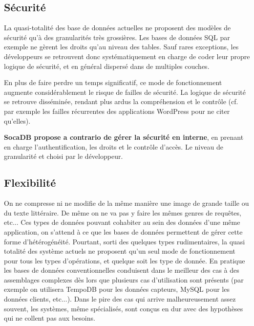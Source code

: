 \documentclass[a4paper,10pt]{scrreprt}
\begin{document}
        \subsection{Sécurité}
        
            La quasi-totalité des base de données actuelles ne proposent des modèles de sécurité qu'à des granularités très grossières. Les bases de données SQL par exemple ne gèrent les droits qu'au niveau des tables. Sauf rares exceptions, les dévelop\-peurs se retrouvent donc systématiquement en charge de coder leur propre logique de sécurité, et en général dispersé dans de multiples couches.
            
            En plus de faire perdre un temps significatif, ce mode de fonctionnement augmente considérablement le risque de failles de sécurité. La logique de sécurité se retrouve disséminée, rendant plus ardus la compréhension et le contrôle (cf. par exemple les failles récurrentes des applications WordPress pour ne citer qu'elles).
            
            \medskip
            \textbf{SocaDB propose a contrario de gérer la sécurité en interne}, en prenant en charge l'authentification, les droits et le contrôle d'accès. Le niveau de granularité et choisi par le développeur.
            
        \subsection{Flexibilité}

            On ne compresse ni ne modifie de la même manière une image de grande taille ou du texte littéraire. De même on ne va pas y faire les mêmes genres de requêtes, etc... Ces types de données pouvant cohabiter au sein des données d'une même application, on s'attend à ce que les bases de données permettent de gérer cette forme d'hétérogénéité. Pourtant, sorti des quelques types rudimentaires, la quasi totalité des système actuels ne proposent qu'un seul mode de fonctionnement pour tous les types d'opérations, et quelque soit les type de donnée. En pratique les bases de données conventionnelles conduisent dans le meilleur des cas à des assemblages complexes dès lors que plusieurs cas d'utilisation sont présents (par exemple on utilisera TempoDB pour les données capteurs, MySQL pour les données clients, etc...). Dans le pire des cas qui arrive malheureusement assez souvent, les systèmes, même spécialisés, sont conçus en dur avec des hypothèses qui ne collent pas aux besoins.
        
\end{document}
